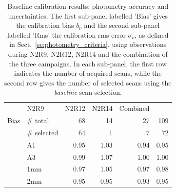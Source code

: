 \begin{table}[!thbp]
  \begin{center}
    \caption[Baseline calibration results]{Baseline calibration results:
  photometry accuracy and uncertainties. The first sub-panel labelled 'Bias' gives the
  calibration bias $b_{\nu}$ and the second sub-panel labelled 'Rms' the calibration
  rms error $\sigma_{\nu}$, as defined in
  Sect.~\ref{se:photometry_criteria},
  using observations during N2R9, N2R12, N2R14 and the combination of
  the three campaigns. {\lp In each sub-panel, the first row indicates the
    number of acquired scans, while the second row gives the
    number of selected scans using the \emph{baseline} scan selection.}}
\label{tab:baseline-photometry}
\begin{tabular}{clrrrr}
  \hline\hline
  \noalign{\smallskip}
  \multicolumn{2}{c}{Characteristics} &  N2R9  & N2R12   &  N2R14 & Combined \\
  \noalign{\smallskip}
  \hline
  \noalign{\smallskip}
  Bias &  $\#$ total    &  68    &  14     &   27     &    109    \\
       &  $\#$ selected &  64    &   1     &   7      &     72    \\
       &  A1            &  0.95  &  1.03   &   0.94   &   0.95    \\
       &  A3            &  0.99  &  1.07   &   1.00   &   1.00    \\
       &  1mm           &  0.97  &  1.05   &   0.97   &   0.98    \\
       &  2mm           &  0.95  &  0.95   &   0.93   &   0.95    \\

\end{tabular}
\end{center}
\end{table}
